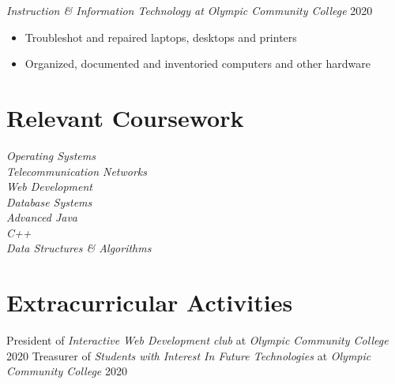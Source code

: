 \documentclass[line]{docs/resume/res}
\begin{document}
\begin{resume}
  {\sl Instruction \& Information Technology at Olympic Community College} \hfill 2020
  \begin{itemize} \itemsep -2pt
    \item Troubleshot and repaired laptops, desktops and printers
    \item Organized, documented and inventoried computers and other hardware
  \end{itemize}

\section{Relevant Coursework}
  {\sl Operating Systems } \\
  {\sl Telecommunication Networks } \\
  {\sl Web Development } \\
  {\sl Database Systems } \\
  {\sl Advanced Java} \\
  {\sl C++} \\
  {\sl Data Structures \& Algorithms}

\section{Extracurricular Activities}
  President of {\it Interactive Web Development club} at {\it Olympic Community College} \hfill 2020
  Treasurer of {\it Students with Interest In Future Technologies} at {\it Olympic Community College} \hfill 2020

\end{resume}
\end{document}

